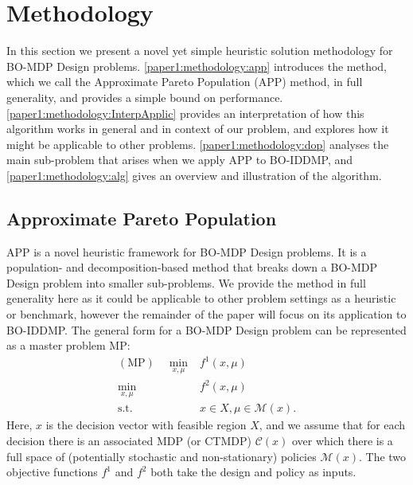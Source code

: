 \documentclass[11pt,authoryear,a4paper]{article}
\theoremstyle{definition}
\begin{document}
{
\section{Methodology}
\label{paper1:methodology}
In this section we present a {novel yet simple heuristic solution methodology for BO-MDP Design problems}. \autoref{paper1:methodology:app} introduces the method, which we call the Approximate Pareto Population (APP) method, in {full generality, and provides a simple bound on performance.} \autoref{paper1:methodology:InterpApplic} provides an interpretation of how this algorithm works in general and in context of our problem, and explores how it might be applicable to other problems. \autoref{paper1:methodology:dop} analyses the main sub-problem that arises when we apply APP to BO-IDDMP, and \autoref{paper1:methodology:alg} gives an overview and illustration of the algorithm.
\subsection{Approximate Pareto Population}
\label{paper1:methodology:app}
APP is a novel heuristic framework for BO-MDP Design problems.  It is a population- and decomposition-based method that breaks down a BO-MDP Design problem into smaller sub-problems. We provide the method in full generality here as it could be applicable to other problem settings as a heuristic or benchmark, however the remainder of the paper will focus on its application to BO-IDDMP. The general form for a BO-MDP Design problem can be represented as a master problem MP:
\begin{align*}
    (\text{MP}) \quad\min_{x,\mu} & f^1(x,\mu)\\
                \min_{x,\mu} & f^2(x,\mu)\\
                \text{s.t. } & x\in X, \mu\in\mathcal{M}(x).
\end{align*}
Here, $x$ is the decision vector with feasible region $X$, and we assume that for each decision there is an associated MDP (or CTMDP) $\mathcal{C}(x)$ over which there is a full space of (potentially stochastic and non-stationary) policies $\mathcal{M}(x)$. The two objective functions $f^1$ and $f^2$ both take the design and policy as inputs. 

}
\end{document}
